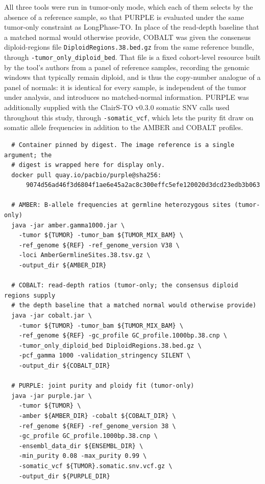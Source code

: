\documentclass[pdflatex,sn-nature]{sn-jnl}
\begin{document}
All three tools were run in tumor-only mode, which each of them selects by the absence of a reference sample, so that PURPLE is evaluated under the same tumor-only constraint as LongPhase-TO. In place of the read-depth baseline that a matched normal would otherwise provide, COBALT was given the consensus diploid-regions file \texttt{DiploidRegions.38.bed.gz} from the same reference bundle, through \texttt{-tumor\_only\_diploid\_bed}. That file is a fixed cohort-level resource built by the tool's authors from a panel of reference samples, recording the genomic windows that typically remain diploid, and is thus the copy-number analogue of a panel of normals: it is identical for every sample, is independent of the tumor under analysis, and introduces no matched-normal information. PURPLE was additionally supplied with the ClairS-TO v0.3.0 somatic SNV calls used throughout this study, through \texttt{-somatic\_vcf}, which lets the purity fit draw on somatic allele frequencies in addition to the AMBER and COBALT profiles.

\begin{verbatim}
  # Container pinned by digest. The image reference is a single argument; the
  # digest is wrapped here for display only.
  docker pull quay.io/pacbio/purple@sha256:
      9074d56ad46f3d6804f1ae6e45a2ac8c300effc5efe120020d3dcd23edb3b063

  # AMBER: B-allele frequencies at germline heterozygous sites (tumor-only)
  java -jar amber.gamma1000.jar \
    -tumor ${TUMOR} -tumor_bam ${TUMOR_MIX_BAM} \
    -ref_genome ${REF} -ref_genome_version V38 \
    -loci AmberGermlineSites.38.tsv.gz \
    -output_dir ${AMBER_DIR}

  # COBALT: read-depth ratios (tumor-only; the consensus diploid regions supply
  # the depth baseline that a matched normal would otherwise provide)
  java -jar cobalt.jar \
    -tumor ${TUMOR} -tumor_bam ${TUMOR_MIX_BAM} \
    -ref_genome ${REF} -gc_profile GC_profile.1000bp.38.cnp \
    -tumor_only_diploid_bed DiploidRegions.38.bed.gz \
    -pcf_gamma 1000 -validation_stringency SILENT \
    -output_dir ${COBALT_DIR}

  # PURPLE: joint purity and ploidy fit (tumor-only)
  java -jar purple.jar \
    -tumor ${TUMOR} \
    -amber ${AMBER_DIR} -cobalt ${COBALT_DIR} \
    -ref_genome ${REF} -ref_genome_version 38 \
    -gc_profile GC_profile.1000bp.38.cnp \
    -ensembl_data_dir ${ENSEMBL_DIR} \
    -min_purity 0.08 -max_purity 0.99 \
    -somatic_vcf ${TUMOR}.somatic.snv.vcf.gz \
    -output_dir ${PURPLE_DIR}
\end{verbatim}
\end{document}

